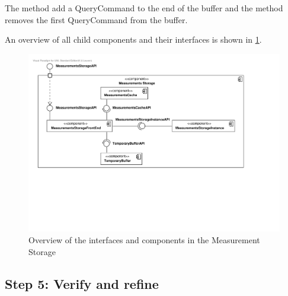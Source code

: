\npar The method  add a QueryCommand to the end
of the buffer and the method  removes the first
QueryCommand from the buffer.

\npar An overview of all child components and their interfaces is shown in
\ref{fig:it4/interfaces}.

\begin{figure}[H]
	\begin{centering}
		\includegraphics[width=\textwidth]{figs/add-it4-interfaces.pdf}
		\caption{Overview of the interfaces and components in the Measurement Storage}
		\label{fig:it4/interfaces}
	\end{centering}
\end{figure}

\subsection{Step 5: Verify and refine}
\label{add:it4/verification}

